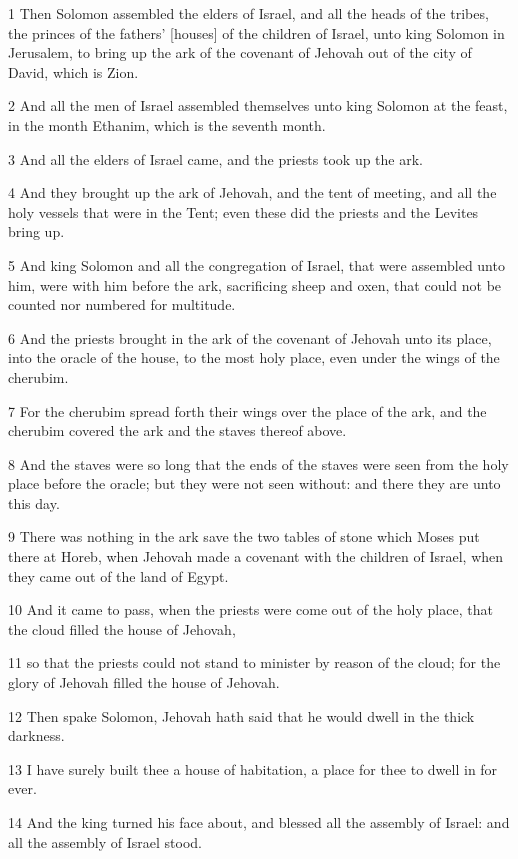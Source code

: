 \par 1 Then Solomon assembled the elders of Israel, and all the heads of the tribes, the princes of the fathers' [houses] of the children of Israel, unto king Solomon in Jerusalem, to bring up the ark of the covenant of Jehovah out of the city of David, which is Zion.
\par 2 And all the men of Israel assembled themselves unto king Solomon at the feast, in the month Ethanim, which is the seventh month.
\par 3 And all the elders of Israel came, and the priests took up the ark.
\par 4 And they brought up the ark of Jehovah, and the tent of meeting, and all the holy vessels that were in the Tent; even these did the priests and the Levites bring up.
\par 5 And king Solomon and all the congregation of Israel, that were assembled unto him, were with him before the ark, sacrificing sheep and oxen, that could not be counted nor numbered for multitude.
\par 6 And the priests brought in the ark of the covenant of Jehovah unto its place, into the oracle of the house, to the most holy place, even under the wings of the cherubim.
\par 7 For the cherubim spread forth their wings over the place of the ark, and the cherubim covered the ark and the staves thereof above.
\par 8 And the staves were so long that the ends of the staves were seen from the holy place before the oracle; but they were not seen without: and there they are unto this day.
\par 9 There was nothing in the ark save the two tables of stone which Moses put there at Horeb, when Jehovah made a covenant with the children of Israel, when they came out of the land of Egypt.
\par 10 And it came to pass, when the priests were come out of the holy place, that the cloud filled the house of Jehovah,
\par 11 so that the priests could not stand to minister by reason of the cloud; for the glory of Jehovah filled the house of Jehovah.
\par 12 Then spake Solomon, Jehovah hath said that he would dwell in the thick darkness.
\par 13 I have surely built thee a house of habitation, a place for thee to dwell in for ever.
\par 14 And the king turned his face about, and blessed all the assembly of Israel: and all the assembly of Israel stood.
